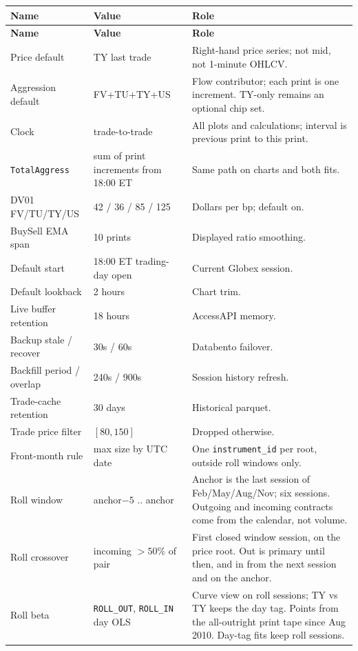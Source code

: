 \documentclass[11pt]{article}
\newcommand{\TotalAggress}{\texttt{TotalAggress}}
\begin{document}
\small
\begin{longtable}{@{}p{}p{}p{}@{}}
\toprule
\textbf{Name} & \textbf{Value} & \textbf{Role} \\
\midrule
\endfirsthead
\toprule
\textbf{Name} & \textbf{Value} & \textbf{Role} \\
\midrule
\endhead
Price default & TY last trade & Right-hand price series; not mid, not 1-minute OHLCV. \\
Aggression default & FV+TU+TY+US & Flow contributor; each print is one increment. TY-only remains an optional chip set. \\
Clock & trade-to-trade & All plots and calculations; interval is previous print to this print. \\
\TotalAggress\ & sum of print increments from 18:00 ET & Same path on charts and both fits. \\
DV01 FV/TU/TY/US & 42 / 36 / 85 / 125 & Dollars per bp; default on. \\
BuySell EMA span & 10 prints & Displayed ratio smoothing. \\
Default start & 18:00 ET trading-day open & Current Globex session. \\
Default lookback & 2 hours & Chart trim. \\
Live buffer retention & 18 hours & AccessAPI memory. \\
Backup stale / recover & 30s / 60s & Databento failover. \\
Backfill period / overlap & 240s / 900s & Session history refresh. \\
Trade-cache retention & 30 days & Historical parquet. \\
Trade price filter & $[80,150]$ & Dropped otherwise. \\
Front-month rule & max size by UTC date & One \texttt{instrument\_id} per root, outside roll windows only. \\
Roll window & anchor$-5$ .. anchor & Anchor is the last session of Feb/May/Aug/Nov; six sessions. Outgoing and incoming contracts come from the calendar, not volume. \\
Roll crossover & incoming $>50\%$ of pair & First closed window session, on the price root. Out is primary until then, and in from the next session and on the anchor. \\
Roll beta & \texttt{ROLL\_OUT}, \texttt{ROLL\_IN} day OLS & Curve view on roll sessions; TY vs TY keeps the day tag. Points from the all-outright print tape since Aug 2010. Day-tag fits keep roll sessions. \\

\end{longtable}
\end{document}
